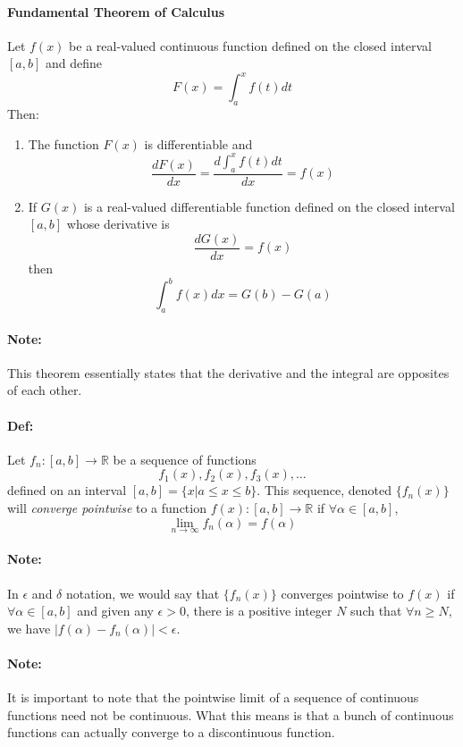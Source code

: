 \documentclass[10pt,a4paper]{article}
\begin{document}
\paragraph{Fundamental Theorem of Calculus} Let $f(x)$ be a real-valued continuous function defined on the closed interval $[a,b]$ and define
$$ F(x) = \int_a^x f(t)dt$$
Then:
\begin{enumerate}
\item The function $F(x)$ is differentiable and 
$$ \frac{dF(x)}{dx} = \frac{d\int_a^xf(t)dt}{dx} = f(x)$$
\item If $G(x)$ is a real-valued differentiable function defined on the closed interval $[a,b]$ whose derivative is
$$ \frac{dG(x)}{dx} = f(x)$$
then
$$ \int_a^b f(x)dx = G(b) - G(a)$$
\end{enumerate}

\paragraph{Note:} This theorem essentially states that the derivative and the integral are opposites of each other.

\paragraph{Def:} Let $f_n: [a,b] \to \mathbb{R}$ be a sequence of functions
$$ f_1(x),f_2(x),f_3(x), \dots$$
defined on an interval $[a,b] = \{x | a \leq x \leq b\}$. This sequence, denoted $\{f_n(x)\}$ will \textit{converge pointwise} to a function $f(x): [a,b] \to \mathbb{R}$ if $\forall \alpha \in [a,b]$,
$$ \lim_{n \to \infty} f_n(\alpha) = f(\alpha)$$

\paragraph{Note:} In $\epsilon$ and $\delta$ notation, we would say that $\{f_n(x)\}$ converges pointwise to $f(x)$ if $\forall \alpha \in [a,b]$ and given any $\epsilon > 0$, there is a positive integer $N$ such that $\forall n \geq N$, we have $|f(\alpha) - f_n(\alpha)|<\epsilon$.

\paragraph{Note:} It is important to note that the pointwise limit of a sequence of continuous functions need not be continuous. What this means is that a bunch of continuous functions can actually converge to a discontinuous function.
\end{document}
